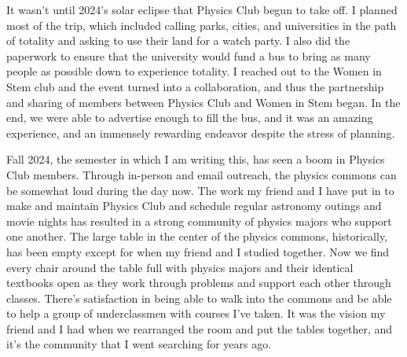 \documentclass[11pt]{article}
\begin{document}
It wasn't until 2024's solar eclipse that Physics Club begun to take off. I planned most of the trip, which included calling parks, cities, and universities in the path of totality and asking to use their land for a watch party. I also did the paperwork to ensure that the university would fund a bus to bring as many people as possible down to experience totality. I reached out to the Women in Stem club and the event turned into a collaboration, and thus the partnership and sharing of members between Physics Club and Women in Stem began. In the end, we were able to advertise enough to fill the bus, and it was an amazing experience, and an immensely rewarding endeavor despite the stress of planning.

Fall 2024, the semester in which I am writing this, has seen a boom in Physics Club members. Through in-person and email outreach, the physics commons can be somewhat loud during the day now. The work my friend and I have put in to make and maintain Physics Club and schedule regular astronomy outings and movie nights has resulted in a strong community of physics majors who support one another. The large table in the center of the physics commons, historically, has been empty except for when my friend and I studied together. Now we find every chair around the table full with physics majors and their identical textbooks open as they work through problems and support each other through classes. There's satisfaction in being able to walk into the commons and be able to help a group of underclassmen with courses I've taken. It was the vision my friend and I had when we rearranged the room and put the tables together, and it's the community that I went searching for years ago.
\end{document}
